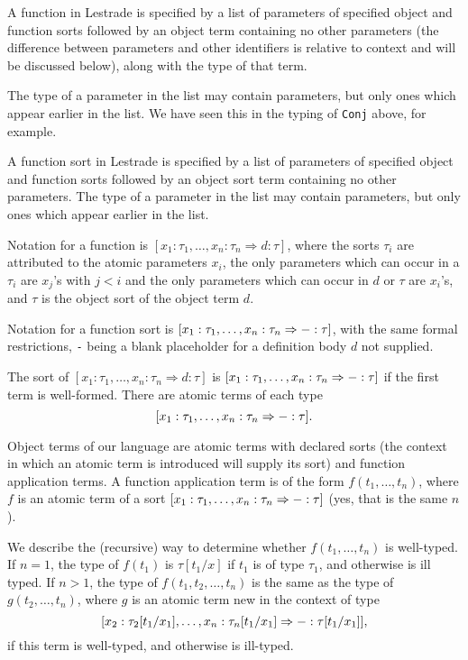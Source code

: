 \documentclass[12pt]{article}
\begin{document}
A function in Lestrade is specified by a list of parameters of specified object and function sorts followed
by an object term containing no other parameters (the difference between parameters and other identifiers is relative to context and will be discussed below), along with the type of that term.

The type of a parameter in the list may contain parameters, but only ones which appear earlier in the list.  We have seen this in the typing of {\tt Conj} above, for example. 

A function sort in Lestrade is specified by a list of parameters of specified object and function sorts followed
by an object sort term containing no other parameters.  The type of a parameter in the list may contain parameters, but only ones which appear earlier in the list.

Notation for a function is $[x_1:\tau_1,\ldots,x_n:\tau_n \Rightarrow d:\tau]$, where the sorts $\tau_i$ are
attributed to the atomic parameters $x_i$, the only parameters which can occur in a $\tau_i$ are $x_j$'s with $j<i$
and the only parameters which can occur in $d$ or $\tau$ are $x_i$'s, and $\tau$ is the object sort of the object term $d$.

Notation for a function sort is $[x_1:\tau_1,\ldots,x_n:\tau_n \Rightarrow {\tt -}:\tau]$, with the same formal restrictions, {\tt -} being a blank placeholder for a definition body $d$ not supplied.

The sort of $[x_1:\tau_1,\ldots,x_n:\tau_n \Rightarrow d:\tau]$ is $[x_1:\tau_1,\ldots,x_n:\tau_n \Rightarrow {\tt -}:\tau]$ if the first term is well-formed.  There are atomic terms of each type $$[x_1:\tau_1,\ldots,x_n:\tau_n \Rightarrow {\tt -}:\tau].$$

Object terms of our language are atomic terms with declared sorts (the context in which an atomic term is introduced will supply its sort) and function application terms.  A function application term is of the form $f(t_1,\ldots,t_n)$,
where $f$ is an atomic term of a sort $[x_1:\tau_1,\ldots,x_n:\tau_n \Rightarrow {\tt -}:\tau]$ (yes, that is the same $n$).

We describe the (recursive) way to determine whether $f(t_1,\ldots,t_n)$ is well-typed.  If $n=1$,
the type of $f(t_1)$ is $\tau[t_1/x]$ if $t_1$ is of type $\tau_1$, and otherwise is ill typed.  If $n>1$,
the type of $f(t_1,t_2,\ldots,t_n)$ is the same as the type of $g(t_2,\ldots,t_n)$, where $g$ is an atomic term new in the context
of type $$[x_2:\tau_2[t_1/x_1],\ldots,x_n:\tau_n[t_1/x_1]\Rightarrow {\tt -}:\tau[t_1/x_1]],$$ if this term is well-typed, and otherwise is ill-typed.
\end{document}
